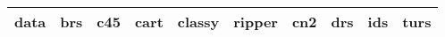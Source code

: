 \begin{table}[ht]
\centering
\begin{tabular}{l|llllllll|l}
  \hline
data & brs & c45 & cart & classy & ripper & cn2 & drs & ids & turs \\ 
  \hline

\end{tabular}
\end{table}
